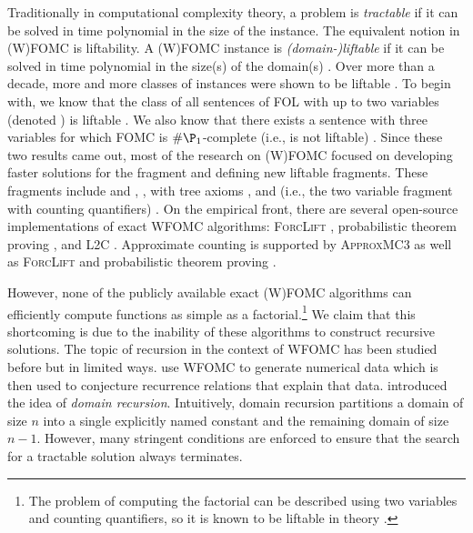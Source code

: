 
Traditionally in computational complexity theory, a problem is \emph{tractable}
if it can be solved in time polynomial in the size of the instance. The
equivalent notion in (W)FOMC is liftability. A (W)FOMC instance is
\emph{(domain-)liftable} if it can be solved in time polynomial in the size(s)
of the domain(s) \citep{jaeger2012liftability}. Over more than a decade, more
and more classes of instances were shown to be liftable
\citep{DBLP:conf/kr/BremenK21,DBLP:conf/nips/KazemiKBP16,DBLP:conf/lics/KuusistoL18,DBLP:journals/jair/Kuzelka21}.
To begin with, we know that the class of all sentences of FOL with up to two
variables (denoted \FOtwo{}) is liftable \citep{DBLP:conf/nips/Broeck11}. We
also know that there exists a sentence with three variables for which FOMC is
$\#\P_{1}$-complete (i.e., \FOthree{} is not liftable)
\citep{DBLP:conf/pods/BeameBGS15}. Since these two results came out, most of the
research on (W)FOMC focused on developing faster solutions for the \FOtwo{}
fragment \citep{DBLP:journals/corr/abs-2110-05992,DBLP:conf/uai/BremenK21} and
defining new liftable fragments. These fragments include \SFO{} and \SRU{}
\citep{DBLP:conf/nips/KazemiKBP16}, \Uone{} \citep{DBLP:conf/lics/KuusistoL18},
\FOtwo{} with tree axioms \citep{DBLP:conf/kr/BremenK21}, and \Ctwo{} (i.e., the
two variable fragment with counting quantifiers)
\citep{DBLP:journals/jair/Kuzelka21,DBLP:journals/corr/abs-2110-05992}. On the
empirical front, there are several open-source implementations of exact WFOMC
algorithms: \textsc{ForcLift} \citep{DBLP:conf/ijcai/BroeckTMDR11},
probabilistic theorem proving \citep{DBLP:journals/cacm/GogateD16}, and
\textsc{L2C} \citep{DBLP:conf/kr/KazemiP16}. Approximate counting is supported
by \textsc{ApproxMC3} \citep{DBLP:conf/ijcai/BremenK20} as well as
\textsc{ForcLift} \citep{DBLP:conf/uai/BroeckCD12} and probabilistic theorem
proving \citep{DBLP:journals/cacm/GogateD16}.


However, none of the publicly available exact (W)FOMC algorithms can efficiently
compute functions as simple as a factorial.\footnote{The problem of computing
  the factorial can be described using two variables and counting quantifiers,
  so it is known to be liftable in theory \citep{DBLP:journals/jair/Kuzelka21}.}
We claim that this shortcoming is due to the inability of these algorithms to
construct recursive solutions. The topic of recursion in the context of WFOMC
has been studied before but in limited ways.
 use WFOMC to generate numerical data which
is then used to conjecture recurrence relations that explain that data.
 introduced the idea of \emph{domain recursion}.
Intuitively, domain recursion partitions a domain of size $n$ into a single
explicitly named constant and the remaining domain of size $n-1$. However, many
stringent conditions are enforced to ensure that the search for a tractable
solution always terminates.

